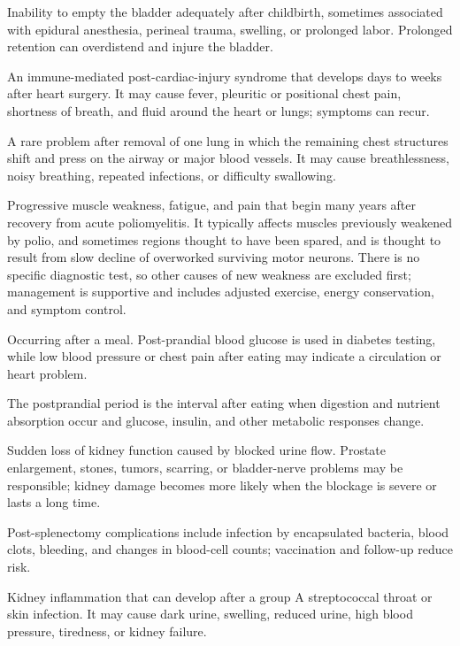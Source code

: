  Inability to empty the bladder adequately after childbirth, sometimes associated with epidural anesthesia, perineal trauma, swelling, or prolonged labor. Prolonged retention can overdistend and injure the bladder.

 An immune-mediated post-cardiac-injury syndrome that develops days to weeks after heart surgery. It may cause fever, pleuritic or positional chest pain, shortness of breath, and fluid around the heart or lungs; symptoms can recur.

 A rare problem after removal of one lung in which the remaining chest structures shift and press on the airway or major blood vessels. It may cause breathlessness, noisy breathing, repeated infections, or difficulty swallowing.

 Progressive muscle weakness, fatigue, and pain that begin many years after recovery from acute poliomyelitis. It typically affects muscles previously weakened by polio, and sometimes regions thought to have been spared, and is thought to result from slow decline of overworked surviving motor neurons. There is no specific diagnostic test, so other causes of new weakness are excluded first; management is supportive and includes adjusted exercise, energy conservation, and symptom control.

 Occurring after a meal. Post-prandial blood glucose is used in diabetes testing, while low blood pressure or chest pain after eating may indicate a circulation or heart problem.

 The postprandial period is the interval after eating when digestion and nutrient absorption occur and glucose, insulin, and other metabolic responses change.

 Sudden loss of kidney function caused by blocked urine flow. Prostate enlargement, stones, tumors, scarring, or bladder-nerve problems may be responsible; kidney damage becomes more likely when the blockage is severe or lasts a long time.

 Post-splenectomy complications include infection by encapsulated bacteria, blood clots, bleeding, and changes in blood-cell counts; vaccination and follow-up reduce risk.

 Kidney inflammation that can develop after a group A streptococcal throat or skin infection. It may cause dark urine, swelling, reduced urine, high blood pressure, tiredness, or kidney failure.


